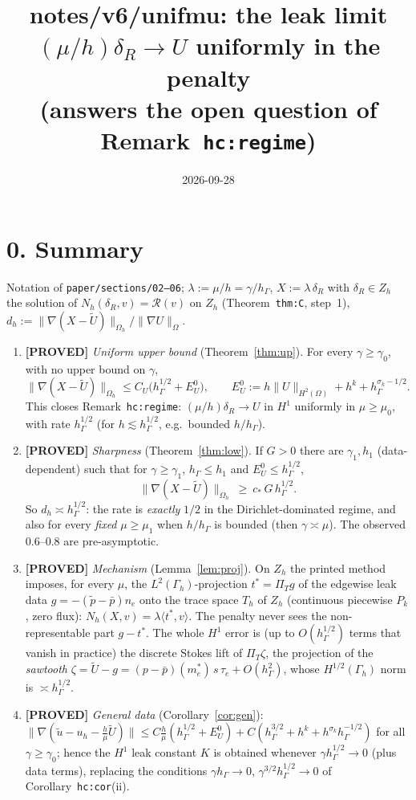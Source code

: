 \documentclass[11pt]{article}
\title{notes/v6/unifmu: the leak limit $(\mu/h)\delta_R\to U$ uniformly in the penalty\\
\large (answers the open question of Remark~\texttt{hc:regime})}
\date{2026-09-28}
\theoremstyle{remark}
\newcommand{\hG}{h_\Gamma}
\newcommand{\Gh}{\Gamma_h}
\newcommand{\Oh}{\Omega_h}
\newcommand{\Zh}{Z_h}
\newcommand{\Th}{T_h}
\newcommand{\PT}{\Pi_T}
\newcommand{\norm}[1]{\|#1\|}
\newcommand{\ip}[2]{\langle #1,#2\rangle}
\newcommand{\Ut}{\tilde U}
\newcommand{\pt}{\tilde p}
\newcommand{\pbar}{\bar p}
\newcommand{\EU}{E^{0}_{U}}
\newcommand{\Rc}{\mathcal R}
\newcommand{\ut}{\tilde u}
\newcommand{\lab}[1]{\textbf{[#1]}}
\begin{document}
\maketitle

\section*{0. Summary}
Notation of \texttt{paper/sections/02--06}; $\lambda:=\mu/h=\gamma/\hG$, $X:=\lambda\,\delta_R$ with $\delta_R\in\Zh$ the solution of
$N_h(\delta_R,v)=\Rc(v)$ on $\Zh$ (Theorem~\texttt{thm:C}, step~1), $d_h:=\norm{\nabla(X-\Ut)}_{\Oh}/\norm{\nabla U}_\Omega$.

\begin{enumerate}[label=(\alph*)]
\item \lab{PROVED} \emph{Uniform upper bound} (Theorem~\ref{thm:up}). For every $\gamma\ge\gamma_0$, with no upper bound on $\gamma$,
\[
\norm{\nabla(X-\Ut)}_{\Oh}\le C_U\bigl(\hG^{1/2}+\EU\bigr),\qquad \EU:=h\norm{U}_{H^2(\Omega)}+h^k+\hG^{\sigma_k-1/2}.
\]
This closes Remark~\texttt{hc:regime}: $(\mu/h)\delta_R\to U$ in $H^1$ uniformly in $\mu\ge\mu_0$, with rate $\hG^{1/2}$ (for $h\lesssim\hG^{1/2}$, e.g.\ bounded $h/\hG$).
\item \lab{PROVED} \emph{Sharpness} (Theorem~\ref{thm:low}). If $G>0$ there are $\gamma_1,h_1$ (data-dependent) such that for $\gamma\ge\gamma_1$, $\hG\le h_1$ and $\EU\le\hG^{1/2}$,
\[
\norm{\nabla(X-\Ut)}_{\Oh}\ \ge\ c_\ast\,G\,\hG^{1/2}.
\]
So $d_h\asymp\hG^{1/2}$: the rate is \emph{exactly} $1/2$ in the Dirichlet-dominated regime, and also for every \emph{fixed} $\mu\ge\mu_1$ when $h/\hG$ is bounded (then $\gamma\asymp\mu$). The observed $0.6$--$0.8$ are pre-asymptotic.
\item \lab{PROVED} \emph{Mechanism} (Lemma~\ref{lem:proj}). On $\Zh$ the printed method imposes, for every $\mu$, the $L^2(\Gh)$-projection $t^\ast=\PT g$ of the edgewise leak data $g=-(\pt-\pbar)n_e$ onto the trace space $\Th$ of $\Zh$ (continuous piecewise $P_k$, zero flux): $N_h(X,v)=\lambda\ip{t^\ast}{v}$. The penalty never sees the non-representable part $g-t^\ast$. The whole $H^1$ error is (up to $O(\hG^{1/2})$ terms that vanish in practice) the discrete Stokes lift of $\PT\zeta$, the projection of the \emph{sawtooth} $\zeta=\Ut-g=(p-\pbar)(m_e^\ast)\,s\,\tau_e+O(\hG^2)$, whose $H^{1/2}(\Gh)$ norm is $\asymp\hG^{1/2}$.
\item \lab{PROVED} \emph{General data} (Corollary~\ref{cor:gen}): $\norm{\nabla(\ut-u_h-\frac h\mu\Ut)}\le C\frac h\mu(\hG^{1/2}+\EU)+C(\hG^{3/2}+h^k+h^{\sigma_k}\hG^{-1/2})$ for all $\gamma\ge\gamma_0$; hence the $H^1$ leak constant $K$ is obtained whenever $\gamma\hG^{1/2}\to0$ (plus data terms), replacing the conditions $\gamma\hG\to0$, $\gamma^{3/2}\hG^{1/2}\to0$ of Corollary~\texttt{hc:cor}(ii).

\end{enumerate}
\end{document}
